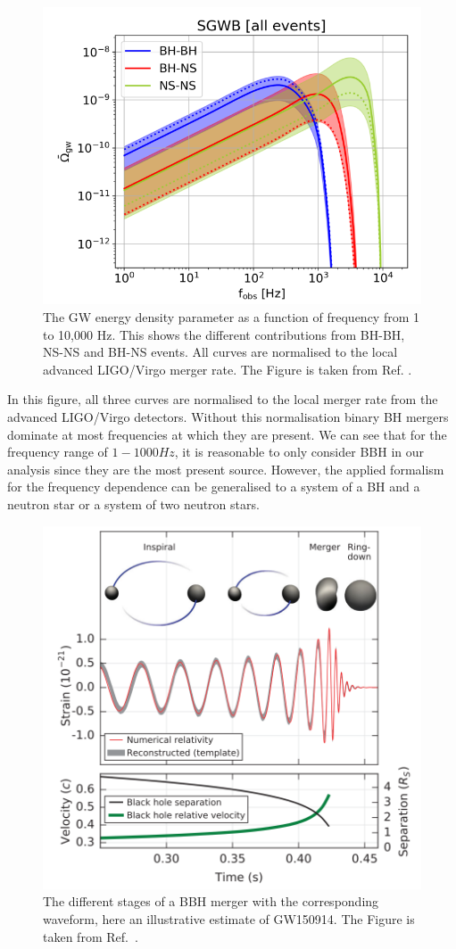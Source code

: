 \begin{figure}[h]
    \centering
    \includegraphics[width=0.7\linewidth]{Images/Capurri_GW_Background_monopole_sources.png}
    \caption[The GW energy density parameter as a function of frequency from 1 to 10,000 Hz.]{The GW energy density parameter as a function of frequency from 1 to 10,000 Hz. This shows the different contributions from BH-BH, NS-NS and BH-NS events. All curves are normalised to the local advanced LIGO/Virgo merger rate. The Figure is taken from Ref. \cite{capurri_intensity_2021}.} 
    \label{BG_sources}
\end{figure} 

In this figure, all three curves are normalised to the local merger rate from the advanced LIGO/Virgo detectors. Without this normalisation binary BH mergers dominate at most frequencies at which they are present. We can see that for the frequency range of $1-1000 Hz$, it is reasonable to only consider BBH in our analysis since they are the most present source. However, the applied formalism for the frequency dependence can be generalised to a system of a BH and a neutron star or a system of two neutron stars.

\begin{figure}[h]
    \centering
    \includegraphics[width=0.7\linewidth]{Images/waveform_abbott_complete.png}
    \caption[The different stages of a BBH merger with the corresponding waveform.]{The different stages of a BBH merger with the corresponding waveform, here an illustrative estimate of GW150914. The Figure is taken from Ref.\ \cite{abbott_observation_2016}.}
    \label{GW_waveform}
\end{figure} 

